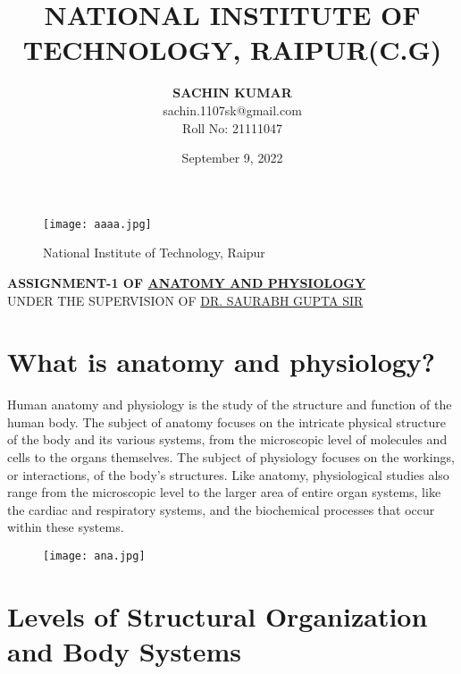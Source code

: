 \documentclass[12pts]{article}
\title{\textbf{NATIONAL INSTITUTE OF TECHNOLOGY, RAIPUR(C.G)}}
\author{\textbf{SACHIN KUMAR}\\sachin.1107sk@gmail.com\\Roll No: 21111047}
\date{September 9, 2022}
\begin{document}
\maketitle
\begin{figure}[h]
\centering
\texttt{[image: aaaa.jpg]}
\caption{National Institute of Technology, Raipur}
\end{figure}
\centering
\textbf{ASSIGNMENT-1 OF \underline{ANATOMY AND PHYSIOLOGY}}\\
\centering
UNDER THE SUPERVISION OF \underline{DR. SAURABH GUPTA SIR}\\

\clearpage

\section*{What is anatomy and physiology?}
\begin{large}
\begin{flushleft}
Human anatomy and physiology is the study of the structure and function of the human body. The subject of anatomy focuses on the intricate physical structure of the body and its various systems, from the microscopic level of molecules and cells to the organs themselves. The subject of physiology focuses on the workings, or interactions, of the body's structures. Like anatomy, physiological studies also range from the microscopic level to the larger area of entire organ systems, like the cardiac and respiratory systems, and the biochemical processes that occur within these systems.
\end{flushleft}
\end{large}

\begin{figure}[h]
\centering
\texttt{[image: ana.jpg]}
\end{figure}

\section*{Levels of Structural 
Organization and 
Body Systems}
\end{document}
